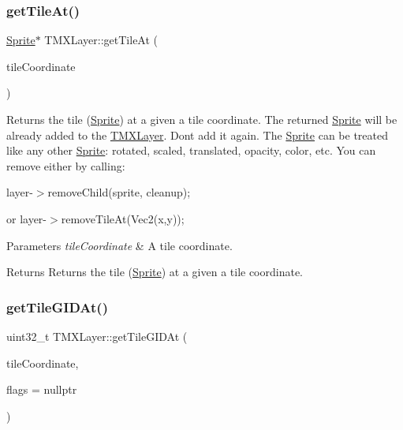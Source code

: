 \subsubsection{\texorpdfstring{get\+Tile\+At()}{getTileAt()}\hspace{0.1cm}{\footnotesize\ttfamily [2/2]}}
{\footnotesize\ttfamily \hyperlink{classSprite}{Sprite}$\ast$ T\+M\+X\+Layer\+::get\+Tile\+At (\begin{DoxyParamCaption}\item[{const \hyperlink{classVec2}{Vec2} \&}]{tile\+Coordinate }\end{DoxyParamCaption})}

Returns the tile (\hyperlink{classSprite}{Sprite}) at a given a tile coordinate. The returned \hyperlink{classSprite}{Sprite} will be already added to the \hyperlink{classTMXLayer}{T\+M\+X\+Layer}. Don\textquotesingle{}t add it again. The \hyperlink{classSprite}{Sprite} can be treated like any other \hyperlink{classSprite}{Sprite}\+: rotated, scaled, translated, opacity, color, etc. You can remove either by calling\+:
\begin{DoxyItemize}
\item layer-\/$>$remove\+Child(sprite, cleanup);
\item or layer-\/$>$remove\+Tile\+At(\+Vec2(x,y));
\end{DoxyItemize}


\begin{DoxyParams}{Parameters}
{\em tile\+Coordinate} & A tile coordinate. \\
\hline
\end{DoxyParams}
\begin{DoxyReturn}{Returns}
Returns the tile (\hyperlink{classSprite}{Sprite}) at a given a tile coordinate. 
\end{DoxyReturn}
\mbox{\label{classTMXLayer_a0a3f3e283a4a654aae4e4e4761e386eb}} 
\subsubsection{\texorpdfstring{get\+Tile\+G\+I\+D\+At()}{getTileGIDAt()}\hspace{0.1cm}{\footnotesize\ttfamily [1/2]}}
{\footnotesize\ttfamily uint32\+\_\+t T\+M\+X\+Layer\+::get\+Tile\+G\+I\+D\+At (\begin{DoxyParamCaption}\item[{const \hyperlink{classVec2}{Vec2} \&}]{tile\+Coordinate,  }\item[{T\+M\+X\+Tile\+Flags $\ast$}]{flags = {\ttfamily nullptr} }\end{DoxyParamCaption})}

